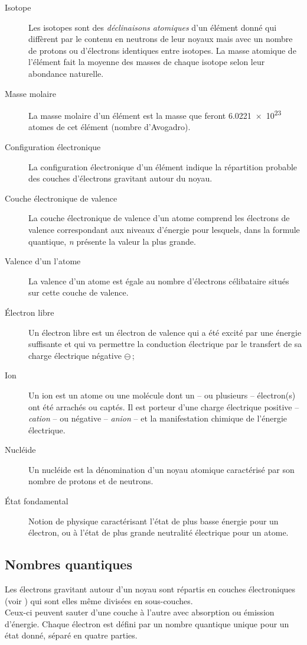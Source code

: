 \begin{description}
	\item[Isotope]
Les isotopes sont des \emph{déclinaisons atomiques} d'un élément donné qui diffèrent par le contenu en neutrons de leur noyaux mais avec un nombre de protons ou d'électrons identiques entre isotopes. La masse atomique de l'élément fait la moyenne des masses de chaque isotope selon leur abondance naturelle.
	\item[Masse molaire]
La masse molaire d'un élément est la masse que feront \num{6,0221e23} atomes de cet élément (nombre d'Avogadro).
	\item[Configuration électronique]
La configuration électronique d'un élément indique la répartition probable des couches d'électrons gravitant autour du noyau.
	\item[Couche électronique de valence]
La couche électronique de valence d'un atome comprend les électrons de valence correspondant aux
niveaux d'énergie pour lesquels, dans la formule quantique, \emph{n} présente la valeur la plus grande.
	\item[Valence d'un l'atome]
La valence d'un atome est égale au nombre d'électrons célibataire situés sur cette couche de valence.
	\item[\'Electron libre]
Un électron libre est un électron de valence qui a été excité par une énergie suffisante et qui va permettre la conduction électrique par le transfert de sa charge électrique négative $\ominus$\,;
	\item[Ion]
Un ion est un atome ou une molécule dont un -- ou plusieurs -- électron(s) ont été arrachés ou captés. Il est porteur d'une charge électrique positive -- \emph{cation} -- ou négative -- \emph{anion} -- et la manifestation chimique de l'énergie électrique.
	\item[Nucléide]
Un nucléide est la dénomination d'un noyau atomique caractérisé par son nombre de protons et de neutrons.
	\item[\'Etat fondamental]
Notion de physique caractérisant l'état de plus basse énergie pour un électron, ou à l'état de plus grande neutralité électrique pour un atome.
\end{description}

\subsection{Nombres quantiques}

Les électrons gravitant autour d'un noyau sont répartis en couches électroniques (voir ) qui sont elles même divisées en sous-couches.\\Ceux-ci peuvent sauter d'une couche à l'autre avec absorption ou émission d'énergie. Chaque électron est défini par un nombre quantique unique pour un état donné, séparé en quatre parties.

